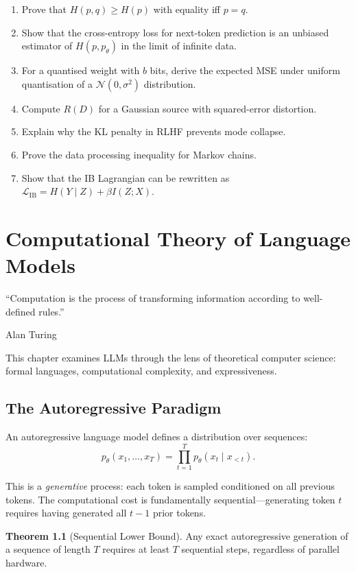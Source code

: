 \documentclass[11pt,a4paper]{book}
\theoremstyle{definition}
\newtheorem{theorem}{Theorem}[chapter]
\begin{document}
\begin{enumerate}
	\item Prove that $H(p,q) \geq H(p)$ with equality iff $p = q$.
	\item Show that the cross-entropy loss for next-token prediction is an unbiased estimator of $H(p, p_\theta)$ in the limit of infinite data.
	\item For a quantised weight with $b$ bits, derive the expected MSE under uniform quantisation of a $\mathcal{N}(0, \sigma^2)$ distribution.
	\item Compute $R(D)$ for a Gaussian source with squared-error distortion.
	\item Explain why the KL penalty in RLHF prevents mode collapse.
	\item Prove the data processing inequality for Markov chains.
	\item Show that the IB Lagrangian can be rewritten as $\mathcal{L}_{\mathrm{IB}} = H(Y \mid Z) + \beta I(Z; X)$.
\end{enumerate}

\chapter{Computational Theory of Language Models}
\label{ch:comp-theory}

\epigraph{``Computation is the process of transforming information according to well-defined rules.''}{Alan Turing}

This chapter examines LLMs through the lens of theoretical computer science: formal languages, computational complexity, and expressiveness.

\section{The Autoregressive Paradigm}

An autoregressive language model defines a distribution over sequences:
\begin{equation}
	p_\theta(x_1, \dots, x_T) = \prod_{t=1}^{T} p_\theta(x_t \mid x_{<t}).
\end{equation}

This is a \emph{generative} process: each token is sampled conditioned on all previous tokens. The computational cost is fundamentally sequential---generating token $t$ requires having generated all $t-1$ prior tokens.

\begin{theorem}[Sequential Lower Bound]
	Any exact autoregressive generation of a sequence of length $T$ requires at least $T$ sequential steps, regardless of parallel hardware.
\end{theorem}
\end{document}
